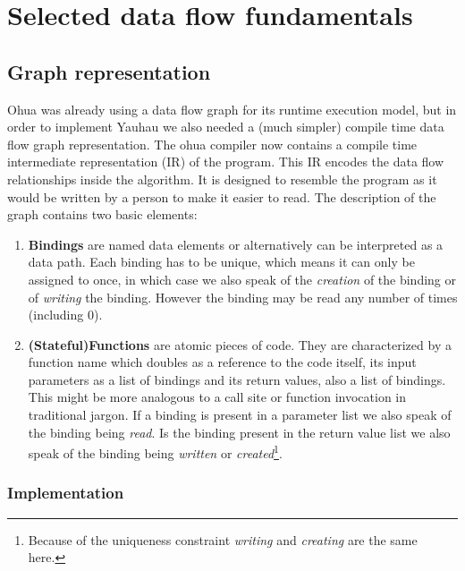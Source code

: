 
\chapter{Selected data flow fundamentals} %

\label{ChapterDataFlow}

\section{Graph representation}

Ohua was already using a data flow graph for its runtime execution model, but in order to implement Yauhau we also needed a (much simpler) compile time data flow graph representation.
The ohua compiler now contains a compile time intermediate representation (IR) of the program.
This IR encodes the data flow relationships inside the algorithm.
It is designed to resemble the program as it would be written by a person to make it easier to read.
The description of the graph contains two basic elements:
\begin{enumerate}
    \item \textbf{Bindings} are named data elements or alternatively can be interpreted as a data path. Each binding has to be unique, which means it can only be assigned to once, in which case we also speak of the \textit{creation} of the binding or of \textit{writing} the binding. However the binding may be read any number of times (including 0).
    \item \textbf{(Stateful)Functions} are atomic pieces of code. They are characterized by a function name which doubles as a reference to the code itself, its input parameters as a list of bindings and its return values, also a list of bindings.
    This might be more analogous to a call site or function invocation in traditional jargon.
    If a binding is present in a parameter list we also speak of the binding being \textit{read}.
    Is the binding present in the return value list we also speak of the binding being \textit{written} or \textit{created}\footnote{Because of the uniqueness constraint \textit{writing} and \textit{creating} are the same here.}.
\end{enumerate}

\subsection{Implementation}

